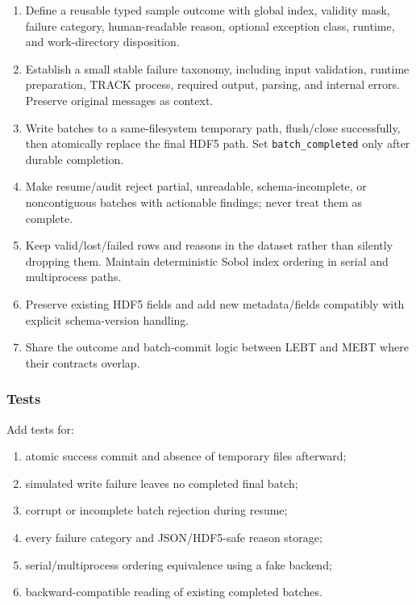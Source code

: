\documentclass[
]{article}
\providecommand{\tightlist}{%
  \setlength{\itemsep}{0pt}\setlength{\parskip}{0pt}}
\begin{document}
\begin{enumerate}
\def\labelenumi{\arabic{enumi}.}
\tightlist
\item
  Define a reusable typed sample outcome with global index, validity
  mask, failure category, human-readable reason, optional exception
  class, runtime, and work-directory disposition.
\item
  Establish a small stable failure taxonomy, including input validation,
  runtime preparation, TRACK process, required output, parsing, and
  internal errors. Preserve original messages as context.
\item
  Write batches to a same-filesystem temporary path, flush/close
  successfully, then atomically replace the final HDF5 path. Set
  \texttt{batch\_completed} only after durable completion.
\item
  Make resume/audit reject partial, unreadable, schema-incomplete, or
  noncontiguous batches with actionable findings; never treat them as
  complete.
\item
  Keep valid/lost/failed rows and reasons in the dataset rather than
  silently dropping them. Maintain deterministic Sobol index ordering in
  serial and multiprocess paths.
\item
  Preserve existing HDF5 fields and add new metadata/fields compatibly
  with explicit schema-version handling.
\item
  Share the outcome and batch-commit logic between LEBT and MEBT where
  their contracts overlap.
\end{enumerate}

\hypertarget{tests-7}{%
\subsubsection{Tests}\label{tests-7}}

Add tests for:

\begin{enumerate}
\def\labelenumi{\arabic{enumi}.}
\tightlist
\item
  atomic success commit and absence of temporary files afterward;
\item
  simulated write failure leaves no completed final batch;
\item
  corrupt or incomplete batch rejection during resume;
\item
  every failure category and JSON/HDF5-safe reason storage;
\item
  serial/multiprocess ordering equivalence using a fake backend;
\item
  backward-compatible reading of existing completed batches.
\end{enumerate}
\end{document}
